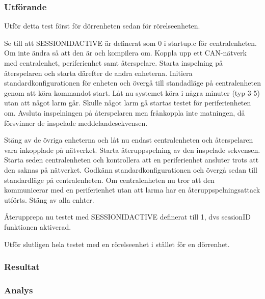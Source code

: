 \subsubsection*{Utförande}
Utför detta test först för dörrenheten sedan för rörelseenheten.


Se till att SESSIONIDACTIVE är definerat som 0 i startup.c för centralenheten.
Om inte ändra så att den är och kompilera om.
Koppla upp ett CAN-nätverk med centralenhet, periferienhet samt återspelare.
Starta inspelning på återspelaren och starta därefter de andra enheterna.
Initiera standardkonfigurationen för enheten och övergå till standadläge på centralenheten genom att köra kommandot start.
Låt nu systemet köra i några minuter (typ 3-5) utan att något larm går.
Skulle något larm gå startas testet för periferienheten om.
Avsluta inspelningen på återspelaren men frånkoppla inte matningen, då försvinner de inspelade meddelandesekvensen.


Stäng av de övriga enheterna och låt nu endast centralenheten och återspelaren vara inkopplade på nätverket.
Starta återuppspelning av den inspelade sekvensen.
Starta seden centralenheten och kontrollera att en periferienhet ansluter trots att den saknas på nätverket.
Godkänn standardkonfigurationen och övergå sedan till standardläge på centralenheten.
Om centralenheten nu tror att den kommunicerar med en periferienhet utan att larma har en återuppspelningsattack utförts.
Stäng av alla enhter.

Återupprepa nu testet med SESSIONIDACTIVE definerat till 1, dvs sessionID funktionen aktiverad.

Utför slutligen hela testet med en rörelseenhet i stället för en dörrenhet.



\subsubsection*{Resultat}



\subsubsection*{Analys}



